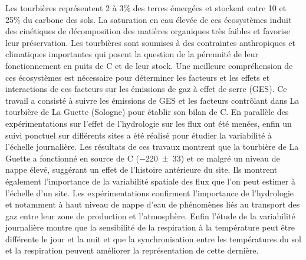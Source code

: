 {\begin{framed}
	\begin{minipage}{\dimexpr\textwidth-2\fboxrule-2\fboxsep}
	Les tourbières représentent 2 à 3\% des terres émergées et stockent entre 10 et 25\% du carbone des sols. La saturation en eau élevée de ces écosystèmes induit des cinétiques de décomposition des matières organiques très faibles et favorise leur préservation. Les tourbières sont soumises à des contraintes anthropiques et climatiques importantes qui posent la question de la pérennité de leur fonctionnement en puits de C et de leur stock. Une meilleure compréhension de ces écosystèmes est nécessaire pour déterminer les facteurs et les effets et interactions de ces facteurs sur les émissions de gaz à effet de serre (GES).
	Ce travail a consisté à suivre les émissions de GES et les facteurs contrôlant dans La tourbière de La Guette (Sologne) pour établir son bilan de C. En parallèle des expérimentations sur l'effet de l'hydrologie sur les flux ont été menées, enfin un suivi ponctuel sur différents sites a été réalisé pour étudier la variabilité à l'échelle journalière.
	Les résultats de ces travaux montrent que la tourbière de La Guette a fonctionné en source de C (\SI{-220(33)}{\gcma}) et ce malgré un niveau de nappe élevé, suggérant un effet de l'histoire antérieure du site. Ils montrent également l'importance de la variabilité spatiale des flux que l'on peut estimer à l'échelle d'un site. Les expérimentations confirment l'importance de l'hydrologie et notamment à haut niveau de nappe d'eau de phénomènes liés au transport des gaz entre leur zone de production et l'atmosphère. Enfin l'étude de la variabilité journalière montre que la sensibilité de la respiration à la température peut être différente le jour et la nuit et que la synchronisation entre les températures du sol et la respiration peuvent améliorer la représentation de cette dernière.

\end{minipage}
\end{framed}}
